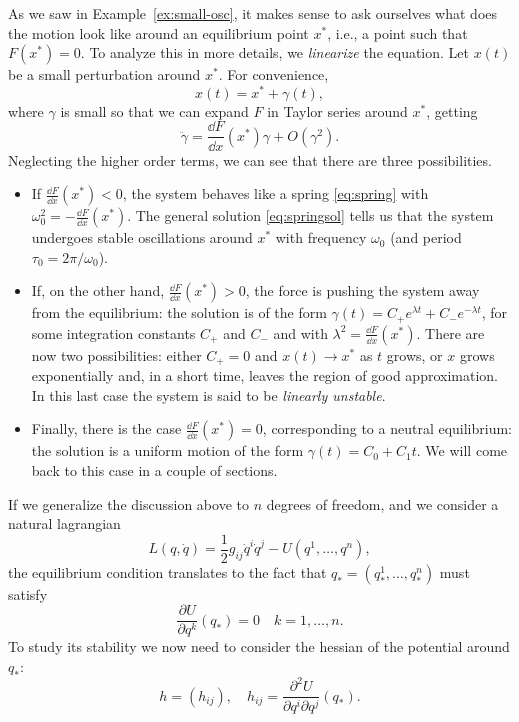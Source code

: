 \documentclass[english,fontsize=11pt,paper=b5]{scrbook}
\theoremstyle{definition}
\begin{document}
    As we saw in Example~\ref{ex:small-osc}, it makes sense to ask ourselves what does the motion look like around an equilibrium point $x^*$, i.e., a point such that $F(x^*) = 0$.
    To analyze this in more details, we \emph{linearize} the equation.
    Let $x(t)$ be a small perturbation around $x^*$. For convenience,
    \begin{equation}
      x(t) = x^* + \gamma(t),
    \end{equation}
    where $\gamma$ is small so that we can expand $F$ in Taylor series around $x^*$, getting
    \begin{equation}
      \ddot \gamma = \frac{\dd F}{\dd x}(x^*)\gamma + O(\gamma^2).
    \end{equation}
    Neglecting the higher order terms, we can see that there are three possibilities.
    \begin{itemize}
      \item If $\frac{\dd F}{\dd x}(x^*) < 0$, the system behaves like a spring \eqref{eq:spring} with $\omega_0^2 = -\frac{\dd F}{\dd x}(x^*)$. The general solution \eqref{eq:springsol} tells us that the system undergoes stable oscillations around $x^*$ with frequency $\omega_0$ (and period $\tau_0 = 2\pi/\omega_0$).
      \item If, on the other hand, $\frac{\dd F}{\dd x}(x^*) > 0$, the force is pushing the system away from the equilibrium: the solution is of the form $\gamma(t) = C_+ e^{\lambda t} + C_- e^{-\lambda t}$, for some integration constants $C_+$ and $C_-$ and with $\lambda^2 = \frac{\dd F}{\dd x}(x^*)$. There are now two possibilities: either $C_+ = 0$ and $x(t) \to x^*$ as $t$ grows, or $x$ grows exponentially and, in a short time, leaves the region of good approximation. In this last case the system is said to be \emph{linearly unstable}.
      \item Finally, there is the case $\frac{\dd F}{\dd x}(x^*) = 0$, corresponding to a neutral equilibrium: the solution is a uniform motion of the form $\gamma(t) = C_0 + C_1 t$.
        We will come back to this case in a couple of sections.
    \end{itemize}

    If we generalize the discussion above to $n$ degrees of freedom, and we consider a natural lagrangian
    \begin{equation}
      L(q,\dot q) = \frac12 g_{ij} \dot q^i \dot q^j - U(q^1, \ldots, q^n),
    \end{equation}
    the equilibrium condition translates to the fact that $q_* = (q_*^1, \ldots, q_*^n)$ must satisfy
    \begin{equation}
      \frac{\partial U}{\partial q^k} (q_*) = 0 \quad k=1,\ldots,n.
    \end{equation}
    To study its stability we now need to consider the hessian of the potential around $q_*$:
    \begin{equation}
      h = (h_{ij}),\quad h_{ij} = \frac{\partial^2 U}{\partial q^i\partial q^j} (q_*).
    \end{equation}
\end{document}
